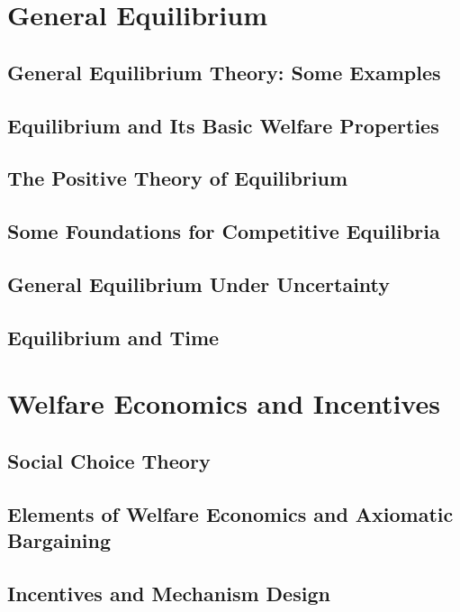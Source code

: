 \documentclass{report} %
\theoremstyle{definition}
\begin{document}
\part{General Equilibrium}

\chapter{General Equilibrium Theory: Some Examples}


\chapter{Equilibrium and Its Basic Welfare Properties}


\chapter{The Positive Theory of Equilibrium}


\chapter{Some Foundations for Competitive Equilibria}


\chapter{General Equilibrium Under Uncertainty}


\chapter{Equilibrium and Time}



\part{Welfare Economics and Incentives}

\chapter{Social Choice Theory}


\chapter{Elements of Welfare Economics and Axiomatic Bargaining}


\chapter{Incentives and Mechanism Design}


\printbibliography
\end{document}
